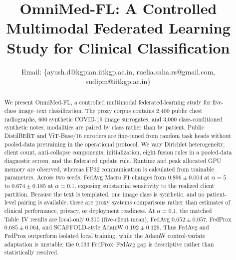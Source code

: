 \documentclass[letterpaper, conference]{IEEEtran}
\begin{document}
\renewcommand{\arraystretch}{0.85}
\setlength{\abovecaptionskip}{0pt}
\setlength{\belowcaptionskip}{0pt}

\setlength{\columnsep}{0.25in}

\renewcommand{\dbltopfraction}{0.9}
\renewcommand{\topfraction}{0.9}

\title{OmniMed-FL: A Controlled Multimodal Federated Learning Study for Clinical Classification}

\author{





Email: \{ayush.d@kgpian.iitkgp.ac.in, ruelia.saha.rs@gmail.com, sudipm@iitkgp.ac.in\}
}

\maketitle

\begin{abstract}
We present OmniMed-FL, a controlled multimodal federated-learning study for
five-class image--text classification. The proxy corpus contains 2,400 public
chest radiographs, 600 synthetic COVID-19 image surrogates, and 3,000
class-conditioned synthetic notes; modalities are paired by class rather than by
patient. Public DistilBERT and ViT-Base/16 encoders are fine-tuned from random task
heads without pooled-data pretraining in the operational protocol. We vary
Dirichlet heterogeneity, client count, anti-collapse components, initialization,
eight fusion rules in a pooled-data diagnostic screen, and the federated update
rule. Runtime and peak allocated GPU
memory are observed, whereas FP32 communication is calculated from trainable
parameters. Across two seeds, FedAvg Macro F1 changes from
$0.896\!\pm\!0.004$ at $\alpha{=}5$ to $0.674\!\pm\!0.185$ at
$\alpha{=}0.1$, exposing substantial sensitivity to the realized client
partition. Because the text is templated, one image class is synthetic, and no
patient-level pairing is available, these are proxy systems comparisons rather
than estimates of clinical performance, privacy, or deployment readiness. At
$\alpha{=}0.1$, the matched Table~IV results are local-only 0.310 (five-client
mean), FedAvg $0.652\!\pm\!0.057$, FedProx
$0.685\!\pm\!0.064$, and SCAFFOLD-style AdamW
$0.192\!\pm\!0.129$. Thus FedAvg and FedProx outperform isolated local training,
while the AdamW control-variate adaptation is unstable; the 0.033 FedProx--FedAvg
gap is descriptive rather than statistically resolved.
\end{abstract}
\end{document}
